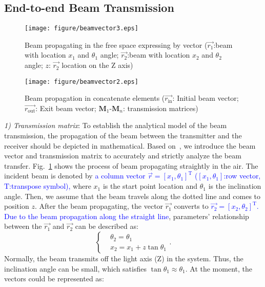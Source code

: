 \documentclass{IEEEtran}
\begin{document}
\subsection{End-to-end Beam Transmission}
\begin{figure}[t]
	\centering
	\texttt{[image: figure/beamvector3.eps]}
	\caption{Beam propagating in the free space expressing by vector ($\vec{r_1}$:beam with location $x_1$ and $\theta_1$ angle; $\vec{r_2}$:beam with location $x_2$ and $\theta_2$ angle; $z$: $\vec{r_2}$ location on the Z axis)}
	\label{TS-M-0}
\end{figure}
\begin{figure}[t]
	\centering
	\texttt{[image: figure/beamvector2.eps]}
	\caption{Beam propagation in concatenate elements ($\vec{r_\mathrm{in}}$: Initial beam vector; $\vec{r_\mathrm{out}}$: Exit beam vector; $\mathbf{M}_1$-$\mathbf{M}_n$: transmission matrices)}
	\label{TS-M}
\end{figure}
\emph{1) Transmission matrix}:
To establish the analytical model of the beam transmission, the propagation of the beam between the transmitter and the receiver should be depicted in mathematical. Based on~\cite{Hodgson2005Laser}, we introduce the beam vector and transmission matrix to accurately and strictly analyze the beam transfer. 
Fig.~\ref{TS-M-0} shows the process of beam propagating straightly in the air. The incident beam is denoted by \textcolor{blue}{a column vector $\vec{r}=[x_1, \theta_1]^\mathrm{T}$ ($[x_1,\theta_1]$:row vector, $\mathrm{T}$:transpose symbol),} where $x_1$ is the start point location and $\theta_1$ is the inclination angle. 
Then, we assume that the beam travels along the dotted line and comes to position $z$. 
After the beam propagating, the vector $\vec{r_1}$ converts to \textcolor{blue}{$\vec{r_2}=[x_2,\theta_2]^\mathrm{T}$. Due to the beam propagation along the straight line}, parameters' relationship between the $\vec{r_1}$ and $\vec{r_2}$ can be described as: 
\begin{equation}\label{tx0}
\left\{
\begin{aligned}
&\theta_2=\theta_1\\
&x_2=x_1+z\tan\theta_1
\end{aligned}
\right..
\end{equation} 
Normally, the beam transmits off the light axis (Z) in the system. Thus, the inclination angle can be small, which satisfies $\tan \theta_1\approx\theta_1$. At the moment, the vectors could be represented as:
\end{document}
